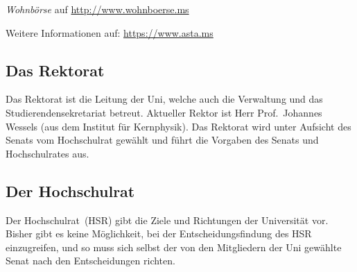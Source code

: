 \begin{multicols*}{2}
\begin{center}
{\begin{minipage}{0.95\columnwidth}
		\textit{Wohnbörse} auf \url{http://www.wohnboerse.ms}
		
		\medskip
		\small
		Weitere Informationen auf: \url{https://www.asta.ms}
	\end{minipage}
	}
\end{center}

\subsection{Das Rektorat}
Das Rektorat ist die Leitung der Uni, welche auch die Verwaltung und das Studierendensekretariat betreut.
Aktueller Rektor ist Herr Prof.\ Johannes Wessels (aus dem Institut für Kernphysik).
Das Rektorat wird unter Aufsicht des Senats vom Hochschulrat gewählt und führt die Vorgaben des Senats und Hochschulrates aus.

\subsection{Der Hochschulrat}
Der Hochschulrat~(HSR) gibt die Ziele und Richtungen der Universität vor.
Bisher gibt es keine Möglichkeit, bei der Entscheidungsfindung des HSR einzugreifen, und so muss sich selbst der von den Mitgliedern der Uni gewählte Senat nach den Entscheidungen richten.

\end{multicols*}

